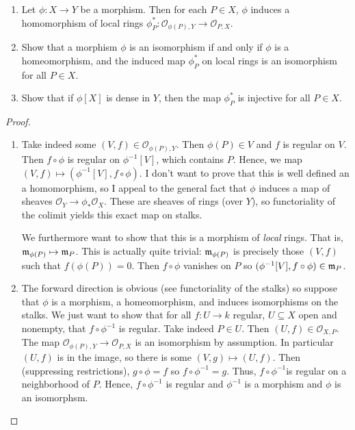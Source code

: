 \label{1.3.3}

\begin{enumerate}[label = (\alph*)]
    \item Let $\phi: X \longrightarrow Y$ be a morphism. Then for each $P \in X$, $\phi$ induces a homomorphism of local rings $\phi_P^*: \mathcal O_{\phi(P), Y} \longrightarrow \mathcal O_{P, X}$.
    
    \item Show that a morphism $\phi$ is an isomorphism if and only if $\phi$ is a homeomorphism, and the induced map $\phi_P^*$ on local rings is an isomorphism for all $P \in X$.

    \item Show that if $\phi[X]$ is dense in $Y$, then the map $\phi_P^*$ is injective for all $P \in X$.
\end{enumerate}

\begin{proof}
    \begin{enumerate}[label = (\alph*)]
        \item Take indeed some $(V, f) \in \mathcal O_{\phi(P), Y}$. Then $\phi(P) \in V$ and $f$ is regular on $V$. Then $f \circ \phi$ is regular on $\phi^{-1}[V]$, which contains $P$. Hence, we map $(V, f) \mapsto (\phi^{-1}[V], f \circ \phi)$. I don't want to prove that this is well defined an a homomorphism, so I appeal to the general fact that $\phi$ induces a map of sheaves $\mathcal O_Y \longrightarrow \phi_* \mathcal O_X$. These are sheaves of rings (over $Y$), so functoriality of the colimit yields this exact map on stalks.

        We furthermore want to show that this is a morphism of \emph{local} rings. That is, $\mathfrak m_{\phi(P)} \mapsto \mathfrak m_P$. This is actually quite trivial: $\mathfrak m_{\phi(P)}$ is precisely those $(V, f)$ such that $f(\phi(P)) = 0$. Then $f \circ \phi$ vanishes on $P$ so $(\phi^{-1}[V], f \circ \phi) \in \mathfrak m_P$.

        \item The forward direction is obvious (see functoriality of the stalks) so suppose that $\phi$ is a morphism, a homeomorphism, and induces isomorphisms on the stalks. We just want to show that for all $f: U \longrightarrow k$ regular, $U \subseteq X$ open and nonempty, that $f \circ \phi^{-1}$ is regular. Take indeed $P \in U$. Then $(U, f) \in \mathcal O_{X, P}$. The map $\mathcal O_{\phi(P), Y} \longrightarrow \mathcal O_{P, X}$ is an isomorphism by assumption. In particular $(U, f)$ is in the image, so there is some $(V, g) \mapsto (U, f)$. Then (suppressing restrictions), $g \circ \phi = f$ so $f \circ \phi^{-1} = g$. Thus, $f \circ \phi^{-1}$is regular on a neighborhood of $P$. Hence, $f \circ \phi^{-1}$ is regular and $\phi^{-1}$ is a morphism and $\phi$ is an isomorphsm.
    \end{enumerate}
\end{proof}
